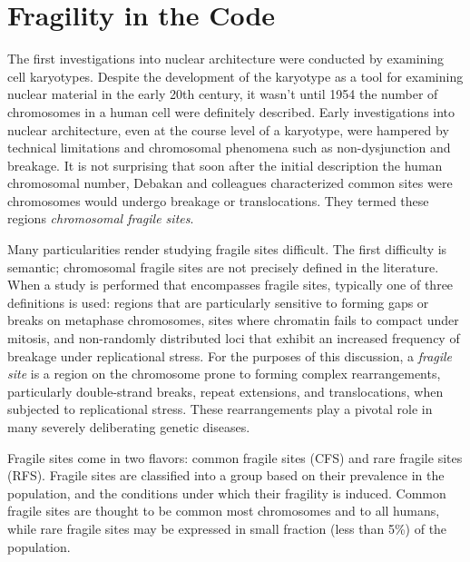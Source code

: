 \documentclass[phd,tocprelim]{cornell}
\begin{document}








\chapter{Fragility in the Code}

The first investigations into nuclear architecture were conducted by
examining cell karyotypes.  Despite the development of the karyotype as a
tool for examining nuclear material in the early 20th
century\cite{levitsky1924}, it wasn't until 1954 the number of chromosomes in
a human cell were definitely described\cite{tjio1956}.  Early investigations
into nuclear architecture, even at the course level of a karyotype, were
hampered by technical limitations and chromosomal phenomena such as
non-dysjunction and breakage.  It is not surprising that soon after the
initial description the human chromosomal number, Debakan and colleagues
characterized common sites were chromosomes would undergo breakage or
translocations.  They termed these regions
\textit{chromosomal fragile sites}\cite{leyden2008}.

Many particularities render studying fragile sites difficult.  The
first difficulty is semantic; chromosomal fragile sites are not precisely
defined in the literature.  When a study is performed that encompasses fragile
sites, typically one of three definitions is used: regions that are particularly
sensitive to forming gaps or breaks on metaphase chromosomes\cite{glover2005},
sites where chromatin fails to compact under mitosis\cite{leyden2008}, and
non-randomly distributed loci that exhibit an increased frequency of breakage
under replicational stress\cite{franchitto2013}.  For the purposes of this
discussion, a \textit{fragile site} is a region on the chromosome prone to
forming complex rearrangements, particularly double-strand breaks, repeat
extensions, and translocations, when subjected to replicational stress.  These
rearrangements play a pivotal role in many severely deliberating genetic
diseases.

Fragile sites come in two flavors: common fragile sites (CFS) and rare fragile
sites (RFS).  Fragile sites are classified into a group based on their
prevalence in the population, and the conditions under which their fragility
is induced\cite{leyden2008}.  Common fragile sites are thought to be common
most chromosomes and to all humans, while rare fragile sites may be expressed
in small fraction (less than 5\%) of the population\cite{wells2006}.
\end{document}
